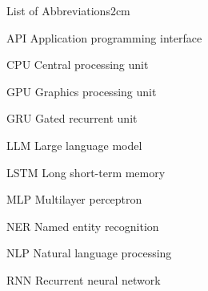 %
%
\begin{mclistof}{List of Abbreviations}{2cm}

\item[API] Application programming interface
\item[CPU] Central processing unit
\item[GPU] Graphics processing unit
\item[GRU] Gated recurrent unit
\item[LLM] Large language model
\item[LSTM] Long short-term memory
\item[MLP] Multilayer perceptron
\item[NER] Named entity recognition
\item[NLP] Natural language processing
\item[RNN] Recurrent neural network

\end{mclistof}
